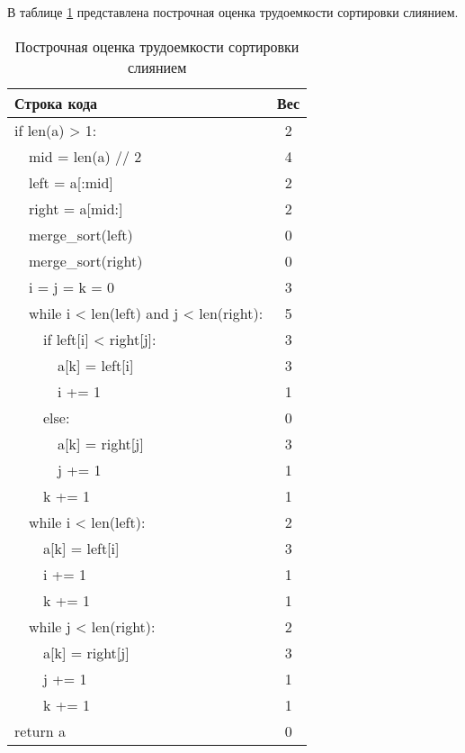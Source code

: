 В таблице \ref{tbl:merge_weight} представлена построчная оценка трудоемкости сортировки слиянием.
\begin{table}[H]
	\begin{center}
		\begin{threeparttable}
			\captionsetup{}
			\caption{\label{tbl:merge_weight}Построчная оценка трудоемкости сортировки слиянием}
			\begin{tabular}{|l|c|}
				\hline
				Строка кода & Вес \\
				\hline
				if len(a) > 1: & 2\\
				\hline
				~~mid = len(a) // 2 & 4\\
				\hline
				~~left = a[:mid] & 2\\
				\hline
				~~right = a[mid:] & 2\\
				\hline
				~~merge\_sort(left) & 0\\
				\hline
				~~merge\_sort(right) & 0\\
				\hline
				~~i = j = k = 0 & 3\\
				\hline
				~~while i < len(left) and j < len(right): & 5\\
				\hline
				~~~~if left[i] < right[j]: & 3\\
				\hline
				~~~~~~a[k] = left[i] & 3\\
				\hline
				~~~~~~i += 1 & 1\\
				\hline
				~~~~else: & 0\\
				\hline
				~~~~~~a[k] = right[j] & 3\\
				\hline
				~~~~~~j += 1 & 1\\
				\hline
				~~~~k += 1 & 1\\
				\hline
				~~while i < len(left): & 2\\
				\hline
				~~~~a[k] = left[i] & 3\\
				\hline
				~~~~i += 1 & 1\\
				\hline
				~~~~k += 1 & 1\\
				\hline
				~~while j < len(right): & 2\\
				\hline
				~~~~a[k] = right[j] & 3\\
				\hline
				~~~~j += 1 & 1\\
				\hline
				~~~~k += 1 & 1\\
				\hline
				return a & 0\\
				\hline
			\end{tabular}
		\end{threeparttable}
	\end{center}
\end{table}

